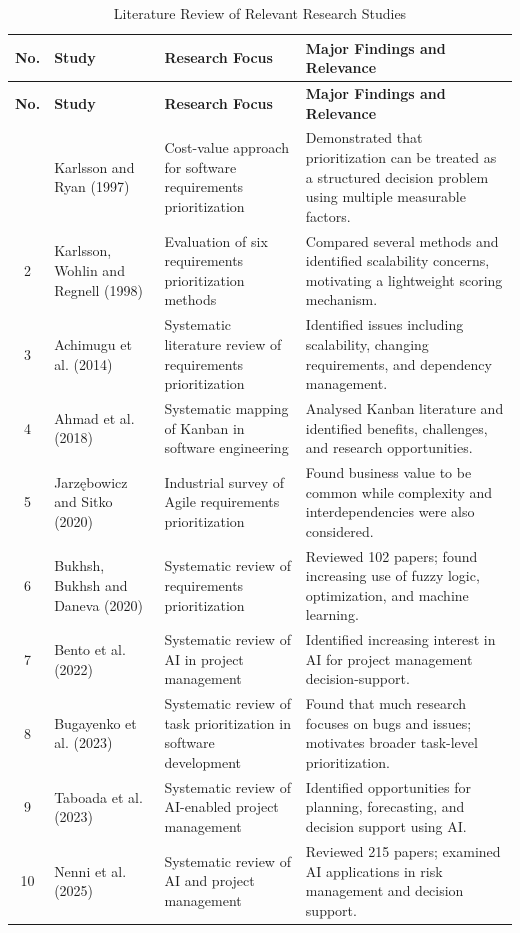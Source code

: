 \documentclass[12pt,a4paper,oneside]{report}
\begin{document}
\begin{longtable}{|c|p{3.5cm}|p{3.5cm}|p{5cm}|}
\caption{Literature Review of Relevant Research Studies} \label{tab:litreview} \\
\hline
\textbf{No.} & \textbf{Study} & \textbf{Research Focus} & \textbf{Major Findings and Relevance} \\
\hline
\endfirsthead
\hline
\textbf{No.} & \textbf{Study} & \textbf{Research Focus} & \textbf{Major Findings and Relevance} \\
\hline
\endhead
\hline
\endfoot
1 & Karlsson and Ryan (1997) & Cost-value approach for software requirements prioritization & Demonstrated that prioritization can be treated as a structured decision problem using multiple measurable factors. \\
\hline
2 & Karlsson, Wohlin and Regnell (1998) & Evaluation of six requirements prioritization methods & Compared several methods and identified scalability concerns, motivating a lightweight scoring mechanism. \\
\hline
3 & Achimugu et al. (2014) & Systematic literature review of requirements prioritization & Identified issues including scalability, changing requirements, and dependency management. \\
\hline
4 & Ahmad et al. (2018) & Systematic mapping of Kanban in software engineering & Analysed Kanban literature and identified benefits, challenges, and research opportunities. \\
\hline
5 & Jarz\k{e}bowicz and Sitko (2020) & Industrial survey of Agile requirements prioritization & Found business value to be common while complexity and interdependencies were also considered. \\
\hline
6 & Bukhsh, Bukhsh and Daneva (2020) & Systematic review of requirements prioritization & Reviewed 102 papers; found increasing use of fuzzy logic, optimization, and machine learning. \\
\hline
7 & Bento et al. (2022) & Systematic review of AI in project management & Identified increasing interest in AI for project management decision-support. \\
\hline
8 & Bugayenko et al. (2023) & Systematic review of task prioritization in software development & Found that much research focuses on bugs and issues; motivates broader task-level prioritization. \\
\hline
9 & Taboada et al. (2023) & Systematic review of AI-enabled project management & Identified opportunities for planning, forecasting, and decision support using AI. \\
\hline
10 & Nenni et al. (2025) & Systematic review of AI and project management & Reviewed 215 papers; examined AI applications in risk management and decision support. \\
\hline
\end{longtable}
\end{document}
